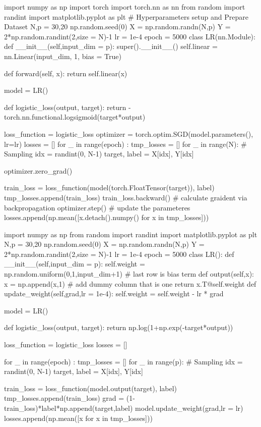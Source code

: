 \documentclass[10pt]{article}
\begin{document}
\begin{python}
import numpy as np
import torch
import torch.nn as nn
from random import randint
import matplotlib.pyplot as plt
# Hyperparameters setup and Prepare Dataset
N,p = 30,20
np.random.seed(0)
X = np.random.randn(N,p)
Y = 2*np.random.randint(2,size = N)-1
lr = 1e-4
epoch = 5000
class LR(nn.Module):
    def __init__(self,input_dim = p):
        super().__init__()
        self.linear = nn.Linear(input_dim, 1, bias = True)
    
    def forward(self, x):
        return self.linear(x)

model = LR()

def logistic_loss(output, target):
    return -torch.nn.functional.logsigmoid(target*output)

loss_function = logistic_loss                                                   
optimizer = torch.optim.SGD(model.parameters(), lr=lr) 
losses = []
for _ in range(epoch) :
    tmp_losses = []
    for _ in range(N):
        # Sampling
        idx = randint(0, N-1)
        target, label = X[idx], Y[idx]

        optimizer.zero_grad()

        train_loss = loss_function(model(torch.FloatTensor(target)), label)
        tmp_losses.append(train_loss)
        train_loss.backward() # calculate graident via backpropagation
        optimizer.step() # update the parameteres
    losses.append(np.mean([x.detach().numpy() for x in tmp_losses]))
    
\end{python}

\begin{python}
import numpy as np
from random import randint
import matplotlib.pyplot as plt
N,p = 30,20
np.random.seed(0)
X = np.random.randn(N,p)
Y = 2*np.random.randint(2,size = N)-1
lr = 1e-4
epoch = 5000
class LR():
    def __init__(self,input_dim = p):
        self.weight = np.random.uniform(0,1,input_dim+1) # last row is bias term
    def output(self,x):
        x = np.append(x,1) # add dummy column that is one
        return x.T@self.weight
    def update_weight(self,grad,lr = 1e-4):
        self.weight = self.weight - lr * grad

model = LR()

def logistic_loss(output, target):
    return np.log(1+np.exp(-target*output))

loss_function = logistic_loss                                                   
losses = []

for _ in range(epoch) :
    tmp_losses = []
    for _ in range(p):
        # Sampling
        idx = randint(0, N-1)
        target, label = X[idx], Y[idx]
        
        train_loss = loss_function(model.output(target), label)
        tmp_losses.append(train_loss)
        grad = (1-train_loss)*label*np.append(target,label)
        model.update_weight(grad,lr = lr)
    losses.append(np.mean([x for x in tmp_losses]))
\end{python}
\end{document}

